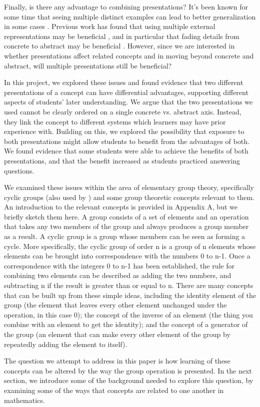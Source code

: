 \documentclass[man,10pt]{apa6}
\begin{document}
Finally, is there any advantage to combining presentations? It's been known for some time that seeing multiple distinct examples can lead to better generalization in some cases \cite{Gick1983}. Previous work has found that using multiple external representations may be beneficial \cite{Ainsworth2006,Rau2016}, and in particular that fading details from concrete to abstract may be beneficial \cite{Goldstone2005,Fyfe2014}. However, since we are interested in whether presentations affect related concepts and in moving beyond concrete and abstract, will multiple presentations still be beneficial? \par 
In this project, we explored these issues and found evidence that two different presentations of a concept can have differential advantages, supporting different aspects of students' later understanding. We argue that the two presentations we used cannot be clearly ordered on a single concrete vs. abstract axis. Instead, they link the concept to different systems which learners may have prior experience with. Building on this, we explored the possibility that exposure to both presentations might allow students to benefit from the advantages of both. We found evidence that some students were able to achieve the benefits of both presentations, and that the benefit increased as students practiced answering questions. \par
We examined these issues within the area of elementary group theory, specifically cyclic groups (also used by ) and some group theoretic concepts relevant to them. An introduction to the relevant concepts is provided in Appendix A, but we briefly sketch them here. A group consists of a set of elements and an operation that takes any two members of the group and always produces a group member as a result. A cyclic group is a group whose members can be seen as forming a cycle. More specifically, the cyclic group of order n is a group of n elements whose elements can be brought into correspondence with the numbers 0 to n-1. Once a correspondence with the integers 0 to n-1 has been established, the rule for combining two elements can be described as adding the two numbers, and subtracting n if the result is greater than or equal to n. There are many concepts that can be built up from these simple ideas, including the identity element of the group (the element that leaves every other element unchanged under the operation, in this case 0); the concept of the inverse of an element (the thing you combine with an element to get the identity); and the concept of a generator of the group (an element that can make every other element of the group by repeatedly adding the element to itself). \par
The question we attempt to address in this paper is how learning of these concepts can be altered by the way the group operation is presented. In the next section, we introduce some of the background needed to explore this question, by examining some of the ways that concepts are related to one another in mathematics.
\end{document}
